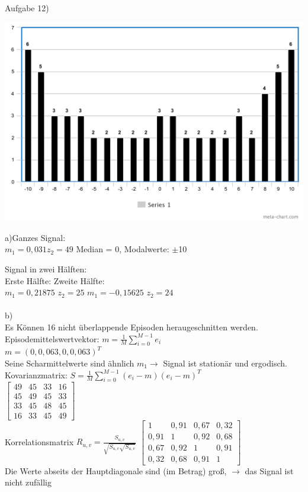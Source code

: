 \documentclass[fleqn,a4paper,12pt]{article}
\begin{document}
\newpage

Aufgabe 12)

\includegraphics[scale=0.4]{H3}

a)Ganzes Signal:\\
$m_1 = 0,031		z_2 = 49$ \hspace{1cm}
Median = 0,	Modalwerte: $\pm $10

Signal in zwei H\"alften:\\
Erste H\"alfte:	\hspace{5cm}										Zweite H\"alfte:\\
$m_1 = 0,21875$  $z_2 = 25$	\hspace{4cm}								$m_1 = -0,15625$  $z_2 = 24$\\
\\
b)\\
Es K\"onnen 16 nicht \"uberlappende Episoden heraugeschnitten werden.
Episodemittelswertvektor: $m = \frac{1}{M}\sum_{i=0}^{M-1}e_i$\\
$m = (0, 0,063, 0, 0,063)^T$\\
Seine Scharmittelwerte sind \"ahnlich $m_1 \rightarrow$ Signal ist  station\"ar und ergodisch.
\newpage
Kovarianzmatrix: $S = \frac{1}{M}\sum_{i=0}^{M-1}(e_i-m)(e_i-m)^T$\\
$
\begin{bmatrix}
49   & 45 & 33	 &  16 \\
45 & 49 	& 45	 &  33 \\
33  & 45	& 48 	 & 45 \\
16 & 33	& 45	 &  49
\end{bmatrix}
$\\
Korrelationsmatrix $R_{u,v} = \frac{S_{u,v}}{\sqrt{S_{u,v} \sqrt{S_{u,v}}}}$
$
\begin{bmatrix}
1   & 0,91 & 0,67	 &  0,32 \\
0,91 & 1 	& 0,92	 &  0,68 \\
0,67 & 0,92	& 1 	 & 0,91 \\
0,32 & 0,68	& 0,91	 &  1
\end{bmatrix}
$\\Die Werte abseits der Hauptdiagonale sind (im Betrag) gro{\ss}, $\rightarrow$ das Signal ist nicht  zuf\"allig\\
	
\end{document}
